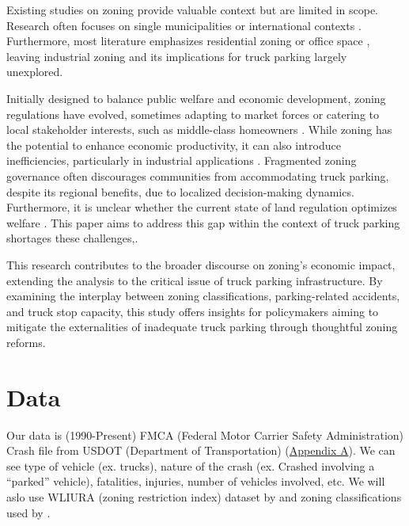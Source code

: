 \documentclass[
  12pt]{article}
\begin{document}
Existing studies on zoning provide valuable context but are limited in
scope. Research often focuses on single municipalities
\citep{shertzerRaceEthnicityDiscriminatory2016, glaeserCausesConsequencesLand2009}
or international contexts \citep{anagolEstimatingEconomicValue2021}.
Furthermore, most literature emphasizes residential zoning
\citep{lensStrictLandUse2016, huangResidentialLandUse2012}or office
space \citep{cheshireOfficeSpaceSupply2008}, leaving industrial zoning
and its implications for truck parking largely unexplored.

Initially designed to balance public welfare and economic development,
zoning regulations have evolved, sometimes adapting to market forces or
catering to local stakeholder interests, such as middle-class homeowners
\citep{fischelEconomicHistoryZoning2024}. While zoning has the potential
to enhance economic productivity, it can also introduce inefficiencies,
particularly in industrial applications
\citep{mcdonaldPDFEconomicsZoning2012}. Fragmented zoning governance
often discourages communities from accommodating truck parking, despite
its regional benefits, due to localized decision-making dynamics.
Furthermore, it is unclear whether the current state of land regulation
optimizes welfare \citep{osmanRestrictiveLandUse2020}. This paper aims
to address this gap within the context of truck parking shortages these
challenges,.

This research contributes to the broader discourse on zoning's economic
impact, extending the analysis to the critical issue of truck parking
infrastructure. By examining the interplay between zoning
classifications, parking-related accidents, and truck stop capacity,
this study offers insights for policymakers aiming to mitigate the
externalities of inadequate truck parking through thoughtful zoning
reforms.

\section{Data}\label{data}

Our data is (1990-Present) FMCA (Federal Motor Carrier Safety
Administration) Crash file from USDOT (Department of Transportation)
(\label{sec:appendix-a}\hyperref[sec-a.-visualization-of-dataset.-]{Appendix
A}). We can see type of vehicle (ex. trucks), nature of the crash (ex.
Crashed involving a ``parked'' vehicle), fatalities, injuries, number of
vehicles involved, etc. We will aslo use WLIURA (zoning restriction
index) dataset by \citet{gyourkoNewMeasureLocal2008} and zoning
classifications used by \citet{puentesTraditionalReformedReview2006} .
\end{document}
